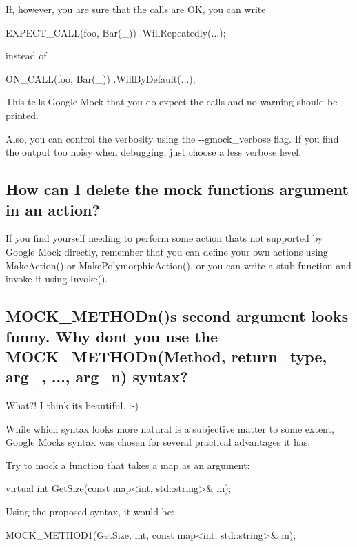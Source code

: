 If, however, you are sure that the calls are OK, you can write


\begin{DoxyCode}
EXPECT\_CALL(foo, Bar(\_))
    .WillRepeatedly(...);
\end{DoxyCode}


instead of


\begin{DoxyCode}
ON\_CALL(foo, Bar(\_))
    .WillByDefault(...);
\end{DoxyCode}


This tells Google Mock that you do expect the calls and no warning should be printed.

Also, you can control the verbosity using the {\ttfamily -\/-\/gmock\+\_\+verbose} flag. If you find the output too noisy when debugging, just choose a less verbose level.

\subsection*{How can I delete the mock function\textquotesingle{}s argument in an action?}

If you find yourself needing to perform some action that\textquotesingle{}s not supported by Google Mock directly, remember that you can define your own actions using Make\+Action() or Make\+Polymorphic\+Action(), or you can write a stub function and invoke it using Invoke().

\subsection*{M\+O\+C\+K\+\_\+\+M\+E\+T\+H\+O\+Dn()\textquotesingle{}s second argument looks funny. Why don\textquotesingle{}t you use the M\+O\+C\+K\+\_\+\+M\+E\+T\+H\+O\+Dn(Method, return\+\_\+type, arg\+\_, ..., arg\+\_\+n) syntax?}

What?! I think it\textquotesingle{}s beautiful. \+:-\/)

While which syntax looks more natural is a subjective matter to some extent, Google Mock\textquotesingle{}s syntax was chosen for several practical advantages it has.

Try to mock a function that takes a map as an argument\+: 
\begin{DoxyCode}
virtual int GetSize(const map<int, std::string>& m);
\end{DoxyCode}


Using the proposed syntax, it would be\+: 
\begin{DoxyCode}
MOCK\_METHOD1(GetSize, int, const map<int, std::string>& m);
\end{DoxyCode}


